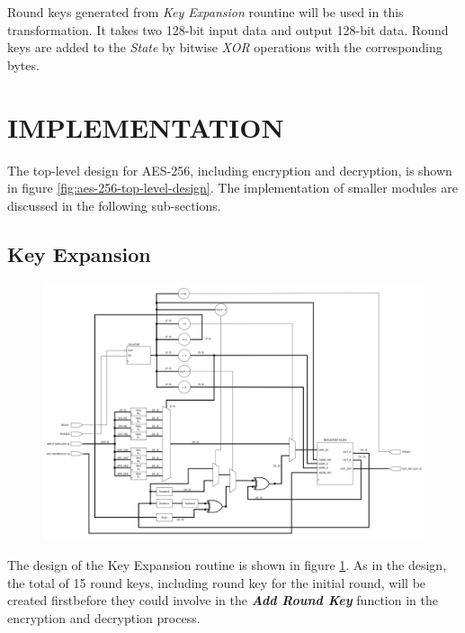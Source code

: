 \documentclass[a4paper, 10pt]{article}
\begin{document}
\begin{multicols}{2}
            Round keys generated from \textit{Key Expansion} rountine will be used in this transformation. It takes two 128-bit input data and output 128-bit data. Round keys are added to the \textit{State} by bitwise \textit{XOR} operations with the corresponding bytes. 

        \section{IMPLEMENTATION}

	The top-level design for AES-256, including encryption and decryption, is shown in figure \ref{fig:aes-256-top-level-design}. The implementation of smaller modules are discussed in the following sub-sections.

          \subsection{Key Expansion}

	\noindent
            \begin{figure}[t]
                \centering
                \includegraphics[width=\linewidth]{KeyExpansion.png}
                \label{fig:KeyExpansion}
            \end{figure}

            The design of the Key Expansion routine is shown in figure \ref{fig:KeyExpansion}. As in the design, the total of 15 round keys, including round key for the initial round, will be created firstbefore they could involve in the \textbf{\textit{Add Round Key}} function in the encryption and decryption process.
            

\end{multicols}
\end{document}
